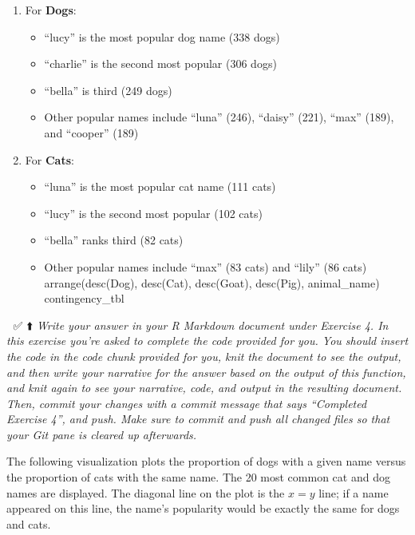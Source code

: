 \documentclass[
]{article}
\providecommand{\tightlist}{%
  \setlength{\itemsep}{0pt}\setlength{\parskip}{0pt}}
\begin{document}
\begin{enumerate}
\def\labelenumi{\arabic{enumi}.}
\tightlist
\item
  For \textbf{Dogs}:

  \begin{itemize}
  \tightlist
  \item
    ``lucy'' is the most popular dog name (338 dogs)
  \item
    ``charlie'' is the second most popular (306 dogs)
  \item
    ``bella'' is third (249 dogs)
  \item
    Other popular names include ``luna'' (246), ``daisy'' (221), ``max''
    (189), and ``cooper'' (189)
  \end{itemize}
\item
  For \textbf{Cats}:

  \begin{itemize}
  \tightlist
  \item
    ``luna'' is the most popular cat name (111 cats)
  \item
    ``lucy'' is the second most popular (102 cats)
  \item
    ``bella'' ranks third (82 cats)
  \item
    Other popular names include ``max'' (83 cats) and ``lily'' (86 cats)
    arrange(desc(Dog), desc(Cat), desc(Goat), desc(Pig), animal\_name)
    contingency\_tbl
  \end{itemize}
\end{enumerate}

🧶 ✅ ⬆️ \emph{Write your answer in your R Markdown document under
Exercise 4. In this exercise you're asked to complete the code provided
for you. You should insert the code in the code chunk provided for you,
knit the document to see the output, and then write your narrative for
the answer based on the output of this function, and knit again to see
your narrative, code, and output in the resulting document. Then, commit
your changes with a commit message that says ``Completed Exercise 4'',
and push. Make sure to commit and push all changed files so that your
Git pane is cleared up afterwards.}

The following visualization plots the proportion of dogs with a given
name versus the proportion of cats with the same name. The 20 most
common cat and dog names are displayed. The diagonal line on the plot is
the \(x = y\) line; if a name appeared on this line, the name's
popularity would be exactly the same for dogs and cats.
\end{document}
